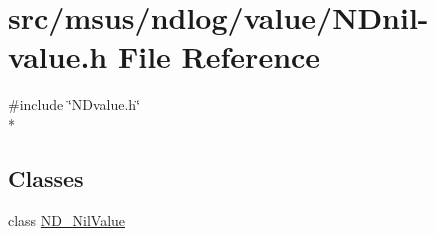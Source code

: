 \hypertarget{_n_dnil-value_8h}{\section{src/msus/ndlog/value/\-N\-Dnil-\/value.h File Reference}
\label{_n_dnil-value_8h}
}
{\ttfamily \#include \char`\"{}N\-Dvalue.\-h\char`\"{}}\\*
\subsection*{Classes}
\begin{DoxyCompactItemize}
\item 
class \hyperlink{class_n_d___nil_value}{N\-D\-\_\-\-Nil\-Value}
\end{DoxyCompactItemize}
